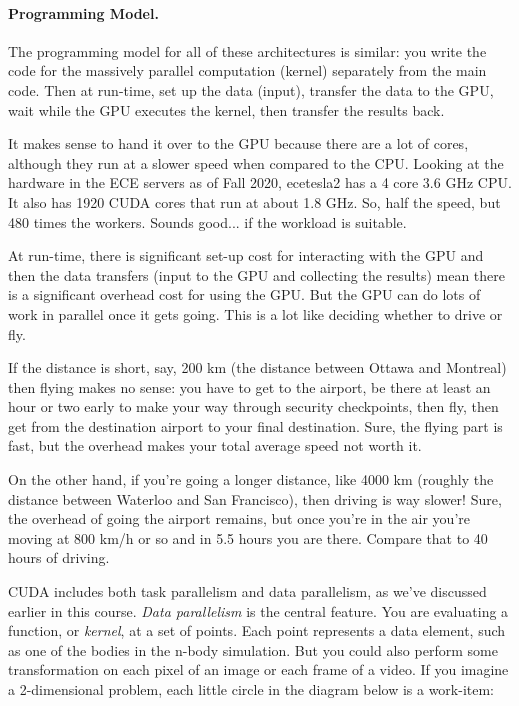 \paragraph{Programming Model.} The programming
model for all of these architectures is similar: you write the code for
the massively parallel computation (kernel) separately from the main
code. Then at run-time, set up the data (input), transfer the data to the GPU, wait while the GPU executes the kernel, then transfer the results back. 

It makes sense to hand it over to the GPU because there are a lot of cores, although they run at a slower speed when compared to the CPU. Looking at the hardware in the ECE servers as of Fall 2020, ecetesla2 has a 4 core 3.6 GHz CPU. It also has 1920 CUDA cores that run at about 1.8 GHz. So, half the speed, but 480 times the workers. Sounds good... if the workload is suitable.

At run-time, there is significant set-up cost for interacting with the GPU and then the data transfers (input to the GPU and collecting the results) mean there is a significant overhead cost for using the GPU. But the GPU can do lots of work in parallel once it gets going. This is a lot like deciding whether to drive or fly. 

If the distance is short, say, 200 km (the distance between Ottawa and Montreal) then flying makes no sense: you have to get to the airport, be there at least an hour or two early to make your way through security checkpoints, then fly, then get from the destination airport to your final destination. Sure, the flying part is fast, but the overhead makes your total average speed not worth it.

On the other hand, if you're going a longer distance, like 4000 km (roughly the distance between Waterloo and San Francisco), then driving is way slower! Sure, the overhead of going the airport remains, but once you're in the air you're moving at 800 km/h or so and in 5.5 hours you are there. Compare that to 40 hours of driving.

CUDA includes both task parallelism and data parallelism, as we've
discussed earlier in this course. \emph{Data parallelism} is the central
feature. You are evaluating a function, or \emph{kernel},
at a set of points. Each point represents a data element, such as one of the
bodies in the n-body simulation. But you could also perform some 
transformation on each pixel of an image or each frame of a video. If you 
imagine a 2-dimensional problem, each little circle in the diagram below is
a work-item:

